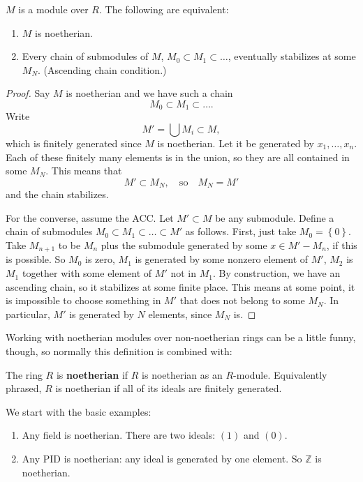 \begin{proposition} $M$ is a module over $R$.
The following are equivalent:
\begin{enumerate}
\item $M$ is noetherian. 
\item Every chain of submodules of $M$, $M_0 \subset M_1 \subset \dots$,
eventually stabilizes at some $M_N$. (Ascending chain condition.)
\end{enumerate}
\end{proposition} 
\begin{proof} 
Say $M$ is noetherian and we have such a chain
\[ M_0 \subset M_1 \subset \dots.  \]
Write
\[ M' = \bigcup M_i \subset M,  \]
which is finitely generated since $M$ is noetherian. Let it be generated by
$x_1, \dots,x_n$. Each of these finitely many elements is in the union, so
they are all contained in some $M_N$. This means that
\[ M' \subset M_N, \quad \mathrm{so} \quad M_N = M'  \]
and the chain stabilizes.

For the converse, assume the ACC.  Let $M' \subset M$ be any submodule.  Define
a chain of submodules $M_0 \subset M_1 \subset  \dots \subset M'$ as follows. First, just take
$M_0 = \left\{0\right\}$. Take $M_{n+1}$ to be $M_n$ plus the submodule
generated by some $x \in M' - M_n$, if this is possible.  So $M_0$ is zero,
$M_1$ is generated by some nonzero element of $M'$, $M_2$ is $M_1$ together
with some element of $M'$ not in $M_1$. By construction, we have an ascending
chain, so it stabilizes at some finite place.  This means at some point, it is
impossible to choose something in $M'$ that does not belong to some $M_N$. In
particular, $M'$ is generated by $N$ elements, since $M_N$ is. 
\end{proof} 


Working with noetherian modules over non-noetherian rings can be a little
funny, though, so normally this definition is combined with:


\begin{definition} 
The ring $R$ is \textbf{noetherian} if $R$ is noetherian as an $R$-module.
Equivalently phrased, $R$ is noetherian if all of its ideals are finitely generated.
\end{definition} 

We start with the basic examples:

\begin{example} 
\begin{enumerate}
\item Any field is noetherian. There are two ideals: $(1)$ and $(0)$. 
\item Any PID is noetherian: any ideal is generated by one element. So
$\mathbb{Z}$ is noetherian.
\end{enumerate}
\end{example} 


